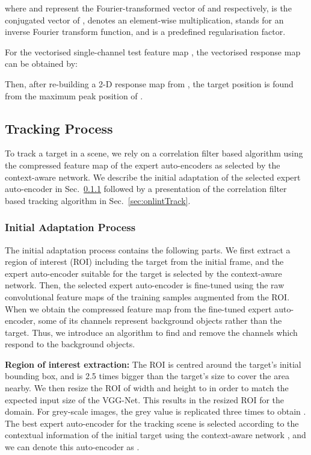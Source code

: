 \documentclass[10pt,twocolumn,letterpaper]{article}
\begin{document}
where  and  represent the Fourier-transformed vector of  and  respectively,  is the conjugated vector of ,  denotes an element-wise multiplication,  stands for an inverse Fourier transform function, and  is a predefined regularisation factor.


For the vectorised single-channel test feature map , the vectorised response map  can be obtained by:
\vspace{-2mm}

Then, after re-building a 2-D response map  from , the target position is found from the maximum peak position of .

 \subsection{Tracking Process}
\label{Sec:tracking}
To track a target in a scene, we rely on a correlation filter based algorithm using the compressed feature map of the expert auto-encoders as selected by the context-aware network. 
We describe the initial adaptation of the selected expert auto-encoder in Sec.~\ref{sec:initialAdap} followed by a presentation of the correlation filter based tracking algorithm in Sec.~\ref{sec:onlintTrack}.


\subsubsection{Initial Adaptation Process} \label{sec:initialAdap}
\hspace{3mm}The initial adaptation process contains the following parts. We first extract a region of interest (ROI) including the target from the initial frame, and the expert auto-encoder suitable for the target is selected by the context-aware network.
Then, the selected expert auto-encoder is fine-tuned using the raw convolutional feature maps of the training samples augmented from the ROI.
When we obtain the compressed feature map from the fine-tuned expert auto-encoder, some of its channels represent background objects rather than the target.
Thus, we introduce an algorithm to find and remove the channels which respond to the background objects.

\textbf{Region of interest extraction: }
The ROI is centred around the target's initial bounding box, and is 2.5 times bigger than the target's size to cover the area nearby. 
We then resize the ROI of width  and height  to  in order to match the expected input size of the VGG-Net.
This results in the resized ROI  for the  domain. 
For grey-scale images, the grey value is replicated three times to obtain .
The best expert auto-encoder for the tracking scene is selected according to the contextual information of the initial target using the context-aware network , and we can denote this auto-encoder as .
\end{document}
